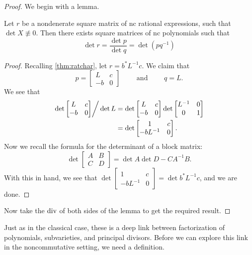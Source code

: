 \begin{proof} We begin with a lemma.
  \begin{lemma}
    Let \(r\) be a nondenerate square matrix of nc rational expressions, such that
    \(\det X \not\equiv 0 \). Then there exists square matrices of nc polynomials
    such that
    \[
      \det r = \frac{\det p}{\det q} = \det (pq ^{-1})
    \]
  \end{lemma}

  \begin{proof}
    Recalling \cref{thm:ratchar}, let \(r = b^* L ^{-1} c\). We claim that
    \[
      p = \begin{bmatrix} L&c\\-b&0 \end{bmatrix}  \qquad \textrm{ and } \qquad q = L.
    \]
    We see that
    \begin{align*}
      \left.\det \begin{bmatrix} L&c\\-b&0 \end{bmatrix}  \right / \det L
        &=\det \begin{bmatrix} L&c\\-b&0 \end{bmatrix} \det \begin{bmatrix} L ^{-1}&0\\0&1 \end{bmatrix} \\
        &= \det \begin{bmatrix} 1&c\\-bL ^{-1}&0 \end{bmatrix} .
    \end{align*}
    Now we recall the formula for the determinant of a block matrix:
    \[
      \det \begin{bmatrix} A&B\\C&D \end{bmatrix}  = \det A\det D - CA^{-1}B.
    \]
    With this in hand, we see that
    \(\det \left[ \begin{smallmatrix}1&c\\-bL^{-1}&0\end{smallmatrix} \right] = \det b^*L ^{-1}c\),
    and we are done.
  \end{proof}
  Now take the \(\operatorname{div}\) of both sides of the lemma to get the required result.
\end{proof}

Just as in the classical case, these is a deep link between factorization of
polynomials, subvarieties, and principal divisors. Before we can explore this
link in the noncommutative setting, we need a definition.

